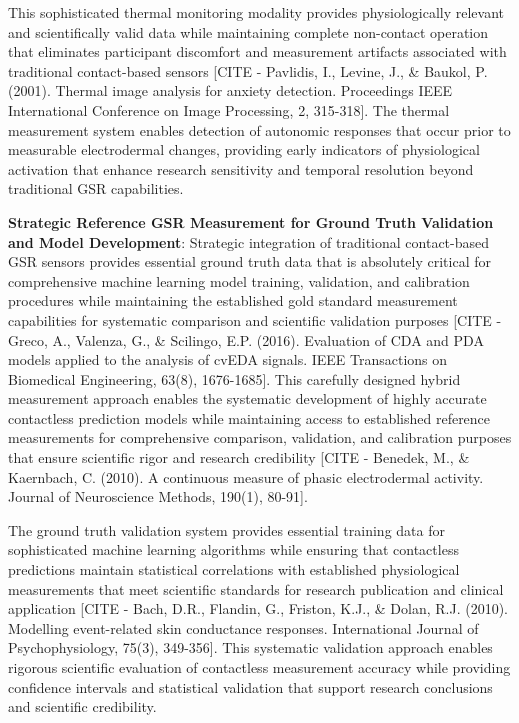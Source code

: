 \documentclass[12pt,a4paper]{report}
\begin{document}
This sophisticated thermal monitoring modality provides physiologically relevant and scientifically valid data while
maintaining complete non-contact operation that eliminates participant discomfort and measurement artifacts associated
with traditional contact-based
sensors [CITE - Pavlidis, I., Levine, J., \& Baukol, P. (2001). Thermal image analysis for anxiety detection. Proceedings IEEE International Conference on Image Processing, 2, 315-318].
The thermal measurement system enables detection of autonomic responses that occur prior to measurable electrodermal
changes, providing early indicators of physiological activation that enhance research sensitivity and temporal
resolution beyond traditional GSR capabilities.

\textbf{Strategic Reference GSR Measurement for Ground Truth Validation and Model Development}: Strategic integration of
traditional contact-based GSR sensors provides essential ground truth data that is absolutely critical for comprehensive
machine learning model training, validation, and calibration procedures while maintaining the established gold standard
measurement capabilities for systematic comparison and scientific validation
purposes [CITE - Greco, A., Valenza, G., \& Scilingo, E.P. (2016). Evaluation of CDA and PDA models applied to the analysis of cvEDA signals. IEEE Transactions on Biomedical Engineering, 63(8), 1676-1685].
This carefully designed hybrid measurement approach enables the systematic development of highly accurate contactless
prediction models while maintaining access to established reference measurements for comprehensive comparison,
validation, and calibration purposes that ensure scientific rigor and research
credibility [CITE - Benedek, M., \& Kaernbach, C. (2010). A continuous measure of phasic electrodermal activity. Journal of Neuroscience Methods, 190(1), 80-91].

The ground truth validation system provides essential training data for sophisticated machine learning algorithms while
ensuring that contactless predictions maintain statistical correlations with established physiological measurements that
meet scientific standards for research publication and clinical
application [CITE - Bach, D.R., Flandin, G., Friston, K.J., \& Dolan, R.J. (2010). Modelling event-related skin conductance responses. International Journal of Psychophysiology, 75(3), 349-356].
This systematic validation approach enables rigorous scientific evaluation of contactless measurement accuracy while
providing confidence intervals and statistical validation that support research conclusions and scientific credibility.
\end{document}
